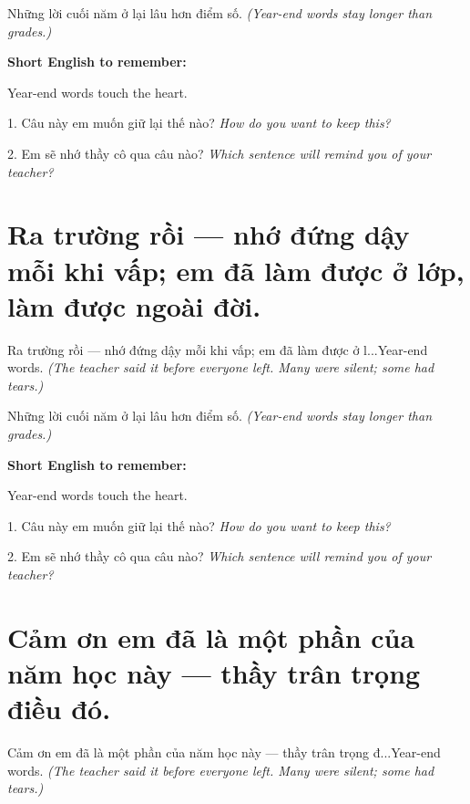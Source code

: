 \begin{baihoc}
Những lời cuối năm ở lại lâu hơn điểm số.
\textit{(Year-end words stay longer than grades.)}
\end{baihoc}

\begin{ghinhoanh}
\textbf{Short English to remember:}

Year-end words touch the heart.

\end{ghinhoanh}

\begin{tuhocnhanh}
1. Câu này em muốn giữ lại thế nào? \textit{How do you want to keep this?}

2. Em sẽ nhớ thầy cô qua câu nào? \textit{Which sentence will remind you of your teacher?}
\end{tuhocnhanh}
\ngancach


\section{Ra trường rồi — nhớ đứng dậy mỗi khi vấp; em đã làm được ở lớp, làm được ngoài đời.}
\begin{truyen}{Ra trường rồi — nhớ đứng dậy mỗi khi vấp; em đã làm được ở l...}{Year-end words.}
\textit{(The teacher said it before everyone left. Many were silent; some had tears.)}
\end{truyen}

\begin{baihoc}
Những lời cuối năm ở lại lâu hơn điểm số.
\textit{(Year-end words stay longer than grades.)}
\end{baihoc}

\begin{ghinhoanh}
\textbf{Short English to remember:}

Year-end words touch the heart.

\end{ghinhoanh}

\begin{tuhocnhanh}
1. Câu này em muốn giữ lại thế nào? \textit{How do you want to keep this?}

2. Em sẽ nhớ thầy cô qua câu nào? \textit{Which sentence will remind you of your teacher?}
\end{tuhocnhanh}
\ngancach


\section{Cảm ơn em đã là một phần của năm học này — thầy trân trọng điều đó.}
\begin{truyen}{Cảm ơn em đã là một phần của năm học này — thầy trân trọng đ...}{Year-end words.}
\textit{(The teacher said it before everyone left. Many were silent; some had tears.)}
\end{truyen}

